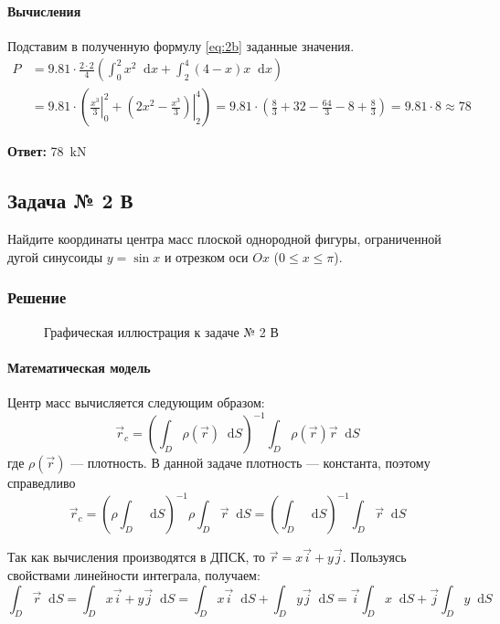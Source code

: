 \documentclass[a4paper,12pt]{article}
\newcommand*\diff{\mathop{}\!\mathrm{d}}
\begin{document}
\paragraph{Вычисления}
Подставим в полученную формулу \ref{eq:2b} заданные значения.
\begin{align*}
  P &= 9.81 \cdot \frac{2 \cdot 2}{4}
    \left(\int_{0}^{2} x^2 \diff x + \int_{2}^{4} (4 - x) x \diff x\right) \\
    &= 9.81 \cdot \left(
      \left.\frac{x^3}{3}\right\rvert_{0}^{2}
      + \left.\left(2 x^2 - \frac{x^3}{3}\right)\right\rvert_{2}^{4}
    \right)
    = 9.81 \cdot
      \left(\frac{8}{3} + 32 - \frac{64}{3} - 8 + \frac{8}{3} \right)
    = 9.81 \cdot 8 \approx 78
\end{align*}

\textbf{Ответ:} \SI{78}{\kilo\newton}

\subsection{Задача № 2 В}

Найдите координаты центра масс плоской однородной фигуры,
ограниченной дугой синусоиды \(y = \sin x\)
и отрезком оси \(Ox\) (\(0 \le x \le \pi\)).

\subsubsection{Решение}

\begin{figure}[htbp]
  \centering
  \caption{Графическая иллюстрация к задаче № 2 В}\label{fig:2c}
\end{figure}

\paragraph{Математическая модель}
Центр масс вычисляется следующим образом:
\[
  \vec{r}_{c} =
    {\left(\int_{D} \rho(\vec{r}) \diff S\right)}^{-1}
    \int_{D} \rho(\vec{r}) \vec{r} \diff S
\]
где \(\rho(\vec{r})\) --- плотность.
В данной задаче плотность --- константа, поэтому справедливо
\begin{equation} \label{eq:2c-main}
  \vec{r}_{c} =
    {\left(\rho \int_{D} \diff S\right)}^{-1}
    \rho \int_{D} \vec{r} \diff S =
    {\left(\int_{D} \diff S\right)}^{-1}
    \int_{D} \vec{r} \diff S
\end{equation}

Так как вычисления производятся в ДПСК, то
\(\vec{r} = x \vec{i} + y \vec{j}\).
Пользуясь свойствами линейности интеграла, получаем:
\begin{equation} \label{eq:2c-main-1}
  \int_{D} \vec{r} \diff S
    = \int_{D} x \vec{i} + y \vec{j} \diff S
    = \int_{D} x \vec{i} \diff S + \int_{D} y \vec{j} \diff S
    = \vec{i} \int_{D} x \diff S + \vec{j} \int_{D} y \diff S
\end{equation}
\end{document}
